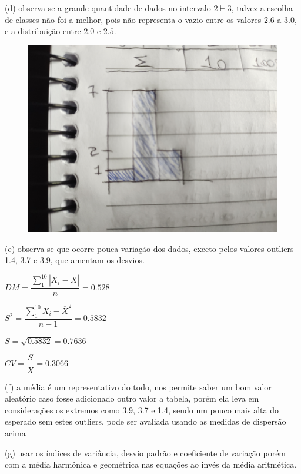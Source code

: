 \documentclass[12pt]{article}   %
\begin{document}
\par (d) observa-se a grande quantidade de dados no intervalo $2 \vdash 3$, talvez a escolha de classes não foi a melhor, pois não representa o vazio entre os valores $2.6$ a $3.0$, e a distribuição entre $2.0$ e $2.5$.
	\begin{figure}[h!]
		\includegraphics[scale=0.05]{q2d}
	\end{figure}
\par (e) observa-se que ocorre pouca variação dos dados, exceto pelos valores outliers 1.4, 3.7 e 3.9, que amentam os desvios.
\vspace{+6pt}
\par $DM = \dfrac{\sum_{1}^{10}|X_i-\overline{X}|}{n} = 0.528$
\vspace{+6pt}
\par $S^2 = \dfrac{\sum_{1}^{10}{X_i-\overline{X}}^2}{n-1} = 0.5832$
\vspace{+6pt}
\par $S = \sqrt{0.5832} = 0.7636$
\vspace{+6pt}
\par $CV = \dfrac{S}{\overline{X}} = 0.3066$
\vspace{+6pt}
\par (f) a média é um representativo do todo, nos permite saber um bom valor aleatório caso fosse adicionado outro valor a tabela, porém ela leva em considerações os extremos como 3.9, 3.7 e 1.4, sendo um pouco mais alta do esperado sem estes outliers, pode ser avaliada usando as medidas de dispersão acima
\par (g) usar os índices de variância, desvio padrão e coeficiente de variação porém com a média harmônica e geométrica nas equações ao invés da média aritmética.
\end{document}
